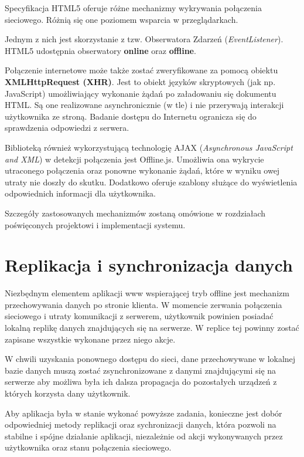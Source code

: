 Specyfikacja HTML5 oferuje różne mechanizmy wykrywania połączenia sieciowego. Różnią się one poziomem wsparcia w przeglądarkach.

Jednym z nich jest skorzystanie z tzw. Obserwatora Zdarzeń (\emph{EventListener}). HTML5 udostępnia obserwatory \textbf{online} oraz \textbf{offline}.

Połączenie internetowe może także zostać zweryfikowane za pomocą obiektu \textbf{XMLHttpRequest (XHR)}. Jest to obiekt języków skryptowych (jak np. JavaScript) umożliwiający wykonanie żądań po załadowaniu się dokumentu HTML. Są one realizowane asynchronicznie (w tle) i nie przerywają interakcji użytkownika ze stroną. Badanie dostępu do Internetu ogranicza się do sprawdzenia odpowiedzi z serwera.

Biblioteką również wykorzystującą technologię AJAX (\emph{Asynchronous JavaScript and XML}) w detekcji połączenia jest Offline.js. Umożliwia ona wykrycie utraconego połączenia oraz ponowne wykonanie żądań, które w wyniku owej utraty nie doszły do skutku. Dodatkowo oferuje szablony służące do wyświetlenia odpowiednich informacji dla użytkownika.

Szczegóły zastosowanych mechanizmów zostaną omówione w rozdziałach poświęconych projektowi i implementacji systemu.

\section{Replikacja i synchronizacja danych}
\label{sec:repIsynchDanych}

Niezbędnym elementem aplikacji www wspierającej tryb offline jest mechanizm  przechowywania danych po stronie klienta. W momencie zerwania połączenia sieciowego  i utraty komunikacji z serwerem, użytkownik powinien posiadać lokalną replikę danych znajdujących się na serwerze. W replice tej powinny zostać zapisane wszystkie wykonane przez niego akcje.

W chwili uzyskania ponownego dostępu do sieci, dane przechowywane w lokalnej bazie danych muszą zostać zsynchronizowane z danymi znajdującymi się na serwerze aby możliwa była ich dalsza propagacja do pozostałych urządzeń z których korzysta dany użytkownik.

Aby aplikacja była w stanie wykonać powyższe zadania, konieczne jest dobór odpowiedniej metody replikacji oraz sychronizacji danych, która pozwoli na stabilne i spójne działanie aplikacji, niezależnie od akcji wykonywanych przez użytkownika oraz stanu połączenia sieciowego.

